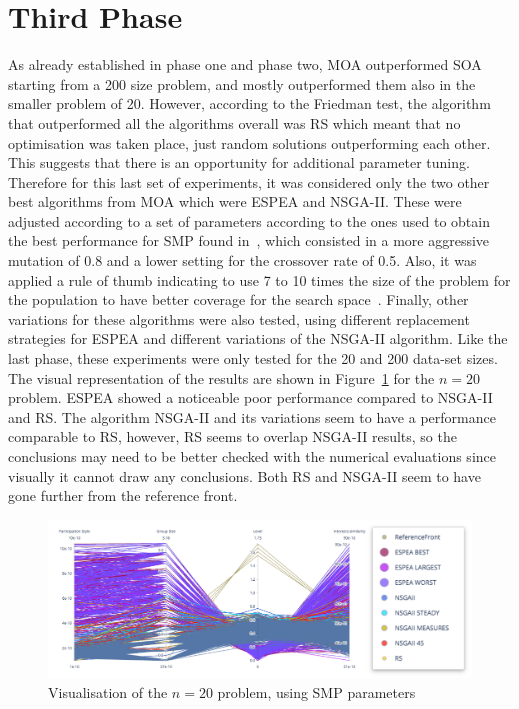 \section{Third Phase}

As already established in phase one and phase two, MOA outperformed SOA starting from a {200} size problem, and mostly outperformed them also in the smaller problem of {20}. However, according to the Friedman test, the algorithm that outperformed all the algorithms overall was RS which meant that no optimisation was taken place, just random solutions outperforming each other.\\

This suggests that there is an opportunity for additional parameter tuning. Therefore for this last set of experiments, it was considered only the two other best algorithms from MOA which were ESPEA and NSGA-II. These were adjusted according to a set of parameters according to the ones used to obtain the best performance for SMP found in~\cite{bello2016genetic}, which consisted in a more aggressive mutation of {0.8} and a lower setting for the crossover rate of {0.5}. Also, it was applied a rule of thumb indicating to use {7} to {10} times the size of the problem for the population to have better coverage for the search space~\cite{kazimipour2014effects}. Finally, other variations for these algorithms were also tested, using different replacement strategies for ESPEA and different variations of the NSGA-II algorithm. Like the last phase, these experiments were only tested for the {20} and {200} data-set sizes.\\

The visual representation of the results are shown in Figure~\ref{fig:3d_smp_20} for the $n=20$ problem. ESPEA showed a noticeable poor performance compared to NSGA-II and RS. The algorithm NSGA-II and its variations seem to have a performance comparable to RS, however, RS seems to overlap NSGA-II results, so the conclusions may need to be better checked with the numerical evaluations since visually it cannot draw any conclusions. Both RS and NSGA-II seem to have gone further from the reference front.

\begin{figure}[H]
    \centering
    \includegraphics[width=\textwidth]{images/smp_20.png}
    \caption{Visualisation of the $n=20$ problem, using SMP parameters}
    \label{fig:3d_smp_20}
\end{figure}

